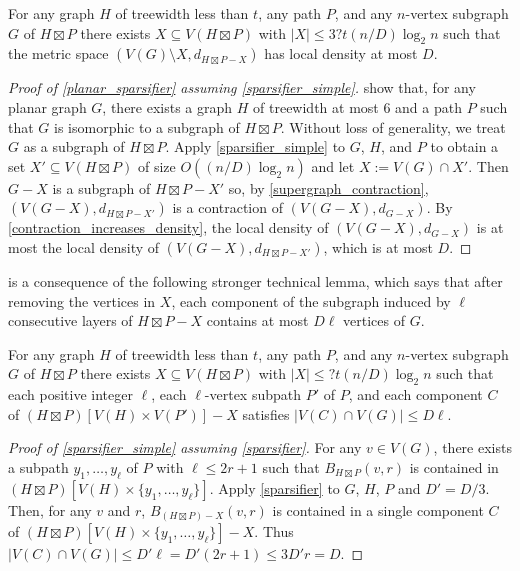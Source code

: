 \documentclass{patmorin}
\renewcommand{\le}{\leqslant}
\begin{document}
\begin{lem}\label{sparsifier_simple}
  For any graph $H$ of treewidth less than $t$, any path $P$, and any $n$-vertex subgraph $G$ of $H\boxtimes P$ there exists $X\subseteq V(H\boxtimes P)$ with $|X|\le 3?t(n/D)\log_2 n$ such that the metric space $(V(G)\setminus X, d_{H\boxtimes P-X})$ has local density at most $D$.
\end{lem}

\begin{proof}[Proof of \cref{planar_sparsifier} assuming \cref{sparsifier_simple}]
  \citet{ueckerdt.wood.ea:improved} show that, for any planar graph $G$, there exists a graph $H$ of treewidth at most $6$ and a path $P$ such that $G$ is isomorphic to a subgraph of $H\boxtimes P$.  Without loss of generality, we treat $G$ as a subgraph of $H\boxtimes P$.  Apply \cref{sparsifier_simple} to $G$, $H$, and $P$ to obtain a set $X'\subseteq V(H\boxtimes P)$ of size $O((n/D)\log_2 n)$ and let $X:=V(G)\cap X'$.  Then $G-X$ is a subgraph of $H\boxtimes P-X'$ so, by \cref{supergraph_contraction}, $(V(G-X),d_{H\boxtimes P-X'})$ is a contraction of $(V(G-X),d_{G-X})$.  By \cref{contraction_increases_density}, the local density of $(V(G-X),d_{G-X})$ is at most the local density of $(V(G-X),d_{H\boxtimes P-X'})$, which is at most $D$.
\end{proof}

 is a consequence of the following stronger technical lemma, which says that after removing the vertices in $X$, each component of the subgraph induced by $\ell$ consecutive layers of $H\boxtimes P-X$ contains at most $D\ell$ vertices of $G$.

\begin{lem}\label{sparsifier}
  For any graph $H$ of treewidth less than $t$, any path $P$, and any $n$-vertex subgraph $G$ of $H\boxtimes P$ there exists $X\subseteq V(H\boxtimes P)$ with $|X|\le ?t(n/D)\log_2 n$ such that each positive integer $\ell$, each $\ell$-vertex subpath $P'$ of $P$, and each component $C$ of $(H\boxtimes P)[V(H)\times V(P')]-X$ satisfies $|V(C)\cap V(G)|\le D\ell$.
\end{lem}

\begin{proof}[Proof of \cref{sparsifier_simple} assuming \cref{sparsifier}]
  For any $v\in V(G)$, there exists a subpath $y_1,\ldots,y_{\ell}$ of $P$ with $\ell\le 2r+1$ such that $B_{H\boxtimes P}(v,r)$ is contained in $(H\boxtimes P)[V(H)\times \{y_1,\ldots,y_{\ell}\}]$.  Apply \cref{sparsifier} to $G$, $H$, $P$ and $D'=D/3$.  Then, for any $v$ and $r$, $B_{(H\boxtimes P)-X}(v,r)$ is contained in a single component $C$ of $(H\boxtimes P)[V(H)\times \{y_1,\ldots,y_{\ell}\}]-X$.  Thus $|V(C)\cap V(G)|\le D'\ell= D'(2r+1)\le 3D'r=D$.
\end{proof}
\end{document}
